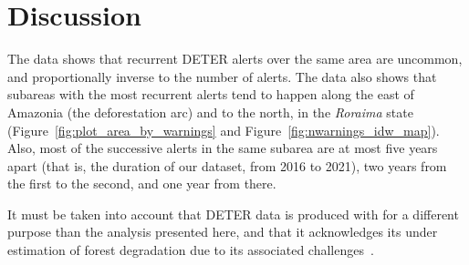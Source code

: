\section{Discussion}

The data shows that recurrent DETER alerts over the same area are uncommon, and proportionally inverse to the number of alerts.
The data also shows that subareas with the most recurrent alerts tend to happen along the east of Amazonia (the deforestation arc) and to the north, in the \textit{Roraima} state (Figure~\ref{fig:plot_area_by_warnings} and Figure~\ref{fig:nwarnings_idw_map}).
Also, most of the successive alerts in the same subarea are at most five years apart (that is, the duration of our dataset, from 2016 to 2021), two years from the first to the second, and one year from there. 

It must be taken into account that DETER data is produced with for a different purpose than the analysis presented here, and that it acknowledges its under estimation of forest degradation due to its associated challenges~\cite{dealmeida2022}.
